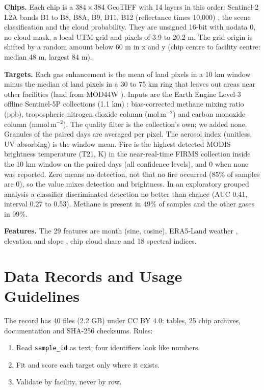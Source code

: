 \documentclass[notspecified,datadescriptor,submit,oneauthor]{Definitions/mdpi}
\begin{document}
\textbf{Chips.} Each chip is a $384\times384$ GeoTIFF with 14 layers in this order: Sentinel-2 L2A bands B1 to B8, B8A, B9, B11, B12 (reflectance times 10,000) \cite{drusch}, the scene classification and the cloud probability. They are unsigned 16-bit with nodata 0, no cloud mask, a local UTM grid and pixels of 3.9 to 20.2 m. The grid origin is shifted by a random amount below 60 m in x and y (chip centre to facility centre: median 48 m, largest 84 m).

\textbf{Targets.} Each gas enhancement is the mean of land pixels in a 10 km window minus the median of land pixels in a 30 to 75 km ring that leaves out areas near other facilities (land from MOD44W \cite{carroll}). Inputs are the Earth Engine Level-3 offline Sentinel-5P collections (1.1 km) \cite{veefkind,gorelick}: bias-corrected methane mixing ratio (ppb), tropospheric nitrogen dioxide column (\textmu mol\,m$^{-2}$) and carbon monoxide column (mmol\,m$^{-2}$). The quality filter is the collection's own; we added none. Granules of the paired days are averaged per pixel. The aerosol index (unitless, UV absorbing) is the window mean. Fire is the highest detected MODIS brightness temperature (T21, K) \cite{giglio} in the near-real-time FIRMS collection inside the 10 km window on the paired days (all confidence levels), and 0 when none was reported. Zero means no detection, not that no fire occurred (85\% of samples are 0), so the value mixes detection and brightness. In an exploratory grouped analysis a classifier discriminated detection no better than chance (AUC 0.41, interval 0.27 to 0.53). Methane is present in 49\% of samples and the other gases in 99\%.

\textbf{Features.} The 29 features are month (sine, cosine), ERA5-Land weather \cite{munoz}, elevation and slope \cite{dem}, chip cloud share and 18 spectral indices.

\section{Data Records and Usage Guidelines}

The record has 40 files (2.2 GB) under CC BY 4.0: tables, 25 chip archives, documentation and SHA-256 checksums. Rules:

\begin{enumerate}[labelsep=2mm]
\item Read \texttt{sample\_id} as text; four identifiers look like numbers.
\item Fit and score each target only where it exists.
\item Validate by facility, never by row.
\end{enumerate}
\end{document}
